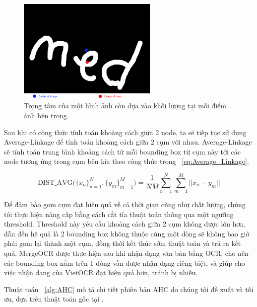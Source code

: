\begin{figure}
\centering
\includegraphics[width=0.6\textwidth]{mep_img/center_of_mass.png}
\caption{Trọng tâm của một hình ảnh còn dựa vào khối lượng tại mỗi điểm ảnh bên trong.}\label{center_of_mass}
\end{figure}

Sau khi có công thức tính toán khoảng cách giữa 2 node, ta sẽ tiếp tục sử dụng Average-Linkage để tính toán khoảng cách giữa 2 cụm với nhau. Average-Linkage sẽ tính toán trung bình khoảng cách từ mỗi bounding box từ cụm này tới các node tương ứng trong cụm bên kia theo công thức trong ~\ref{eq:Average_Linkage}.

\begin{dmath}
    \label{eq:Average_Linkage}
    \text{DIST_AVG(} {\{x_n\}}_{n=1}^N, {\{y_m\}}_{m=1}^M \text{)} = \frac{1}{NM}\sum_{n=1}^{N}\sum_{m=1}^{M} ||x_n - y_m ||
\end{dmath}

Để đảm bảo gom cụm đạt hiệu quả về cả thời gian cũng như chất lượng, chúng tôi thực hiện nâng cấp bằng cách cắt tỉa thuật toán thông qua một ngưỡng threshold. Threshold này yêu cầu khoảng cách giữa 2 cụm không được lớn hơn, dẫn đến hệ quả là 2 bounding box không thuộc cùng một dòng sẽ không bao giờ phải gom lại thành một cụm, đồng thời kết thúc sớm thuật toán và trả ra kết quả. MergeOCR được thực hiện sau khi nhận dạng văn bản bằng OCR, cho nên các bounding box nằm trên 1 dòng vẫn được nhận dạng riêng biệt, và giúp cho việc nhận dạng của VietOCR đạt hiệu quả hơn, tránh bị nhiễu.

Thuật toán ~\ref{alg:AHC} mô tả chi tiết phiên bản AHC do chúng tôi đề xuất và tối ưu, dựa trên thuật toán gốc tại \cite{day1984efficient}.

